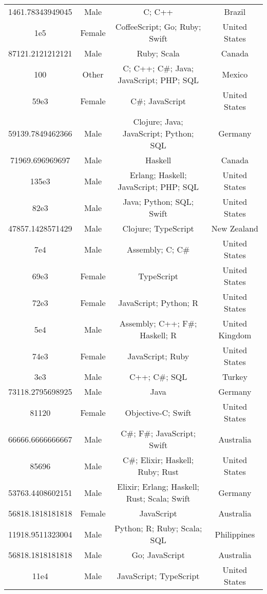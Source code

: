 \begin{center}
\begin{tabular}{ |c|c|c|c| }
1461.78343949045  &  Male  &  C; C++  &  Brazil  \\ 
1e5  &  Female  &  CoffeeScript; Go; Ruby; Swift  &  United States  \\ 
87121.2121212121  &  Male  &  Ruby; Scala  &  Canada  \\ 
100  &  Other  &  C; C++; C\#; Java; JavaScript; PHP; SQL  &  Mexico  \\ 
59e3  &  Female  &  C\#; JavaScript  &  United States  \\ 
59139.7849462366  &  Male  &  Clojure; Java; JavaScript; Python; SQL  &  Germany  \\ 
71969.696969697  &  Male  &  Haskell  &  Canada  \\ 
135e3  &  Male  &  Erlang; Haskell; JavaScript; PHP; SQL  &  United States  \\ 
82e3  &  Male  &  Java; Python; SQL; Swift  &  United States  \\ 
47857.1428571429  &  Male  &  Clojure; TypeScript  &  New Zealand  \\ 
7e4  &  Male  &  Assembly; C; C\#  &  United States  \\ 
69e3  &  Female  &  TypeScript  &  United States  \\ 
72e3  &  Female  &  JavaScript; Python; R  &  United States  \\ 
5e4  &  Male  &  Assembly; C++; F\#; Haskell; R  &  United Kingdom  \\ 
74e3  &  Female  &  JavaScript; Ruby  &  United States  \\ 
3e3  &  Male  &  C++; C\#; SQL  &  Turkey  \\ 
73118.2795698925  &  Male  &  Java  &  Germany  \\ 
81120  &  Female  &  Objective-C; Swift  &  United States  \\ 
66666.6666666667  &  Male  &  C\#; F\#; JavaScript; Swift  &  Australia  \\ 
85696  &  Male  &  C\#; Elixir; Haskell; Ruby; Rust  &  United States  \\ 
53763.4408602151  &  Male  &  Elixir; Erlang; Haskell; Rust; Scala; Swift  &  Germany  \\ 
56818.1818181818  &  Female  &  JavaScript  &  Australia  \\ 
11918.9511323004  &  Male  &  Python; R; Ruby; Scala; SQL  &  Philippines  \\ 
56818.1818181818  &  Male  &  Go; JavaScript  &  Australia  \\ 
11e4  &  Male  &  JavaScript; TypeScript  &  United States  \\ 

\end{tabular}
\end{center}
